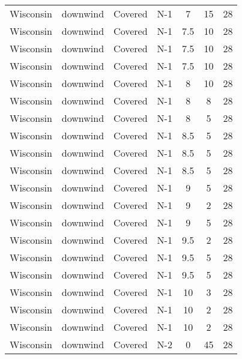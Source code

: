 \documentclass{article}
\begin{document}
\begin{longtable}[c]{ccccccc}
Wisconsin & downwind  & Covered     & N-1             & 7            & 15          & 28  \\
Wisconsin & downwind  & Covered     & N-1             & 7.5          & 10          & 28  \\
Wisconsin & downwind  & Covered     & N-1             & 7.5          & 10          & 28  \\
Wisconsin & downwind  & Covered     & N-1             & 7.5          & 10          & 28  \\
Wisconsin & downwind  & Covered     & N-1             & 8            & 10          & 28  \\
Wisconsin & downwind  & Covered     & N-1             & 8            & 8           & 28  \\
Wisconsin & downwind  & Covered     & N-1             & 8            & 5           & 28  \\
Wisconsin & downwind  & Covered     & N-1             & 8.5          & 5           & 28  \\
Wisconsin & downwind  & Covered     & N-1             & 8.5          & 5           & 28  \\
Wisconsin & downwind  & Covered     & N-1             & 8.5          & 5           & 28  \\
Wisconsin & downwind  & Covered     & N-1             & 9            & 5           & 28  \\
Wisconsin & downwind  & Covered     & N-1             & 9            & 2           & 28  \\
Wisconsin & downwind  & Covered     & N-1             & 9            & 5           & 28  \\
Wisconsin & downwind  & Covered     & N-1             & 9.5          & 2           & 28  \\
Wisconsin & downwind  & Covered     & N-1             & 9.5          & 5           & 28  \\
Wisconsin & downwind  & Covered     & N-1             & 9.5          & 5           & 28  \\
Wisconsin & downwind  & Covered     & N-1             & 10           & 3           & 28  \\
Wisconsin & downwind  & Covered     & N-1             & 10           & 2           & 28  \\
Wisconsin & downwind  & Covered     & N-1             & 10           & 2           & 28  \\
Wisconsin & downwind  & Covered     & N-2             & 0            & 45          & 28  \\

\end{longtable}
\end{document}
